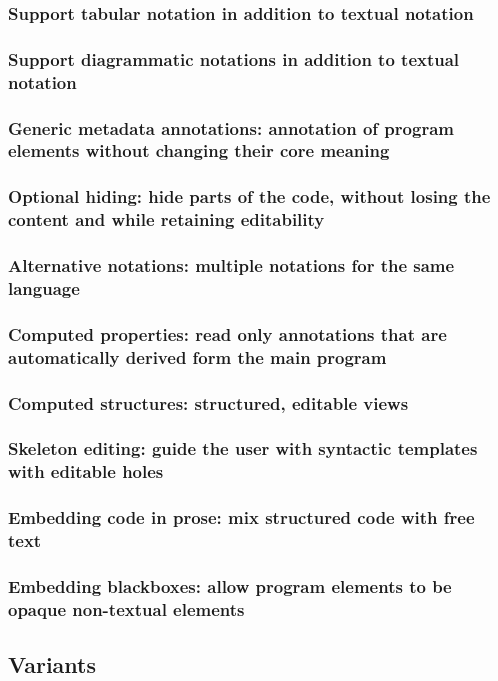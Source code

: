 \documentclass[preprint,numbers,10pt]{sigplanconf}
\begin{document}
\subsubsection{Support tabular notation in addition to textual notation}
\subsubsection{Support diagrammatic notations in addition to textual notation}
\subsubsection{Generic metadata annotations: annotation of program elements without changing their core meaning}
\subsubsection{Optional hiding: hide parts of the code, without losing the content and while retaining editability}
\subsubsection{Alternative notations: multiple notations for the same language}
\subsubsection{Computed properties: read only annotations that are automatically derived form the main program}
\subsubsection{Computed structures: structured, editable views}
\subsubsection{Skeleton editing: guide the user with syntactic templates with editable holes}
\subsubsection{Embedding code in prose: mix structured code with free text}
\subsubsection{Embedding blackboxes: allow program elements to be opaque non-textual elements}

\subsection{Variants}
\end{document}
